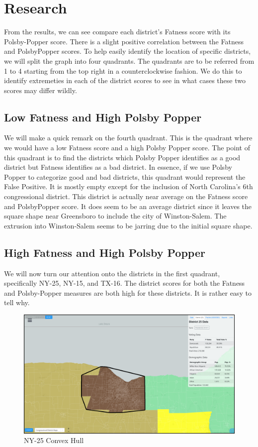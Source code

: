 \documentclass[letterpaper]{article}
\begin{document}
\section{Research}
From the results, we can see compare each district's Fatness score with its Polsby-Popper score. There is a slight positive correlation between the Fatness and PolsbyPopper scores.
To help easily identify the location of specific districts, we will split the graph into four quadrants. The quadrants are to be referred from 1 to 4 starting from the top right in a counterclockwise fashion. We do this to identify extremeties in each of the district scores to see in what cases these two scores may differ wildly.

\subsection{Low Fatness and High Polsby Popper}
We will make a quick remark on the fourth quadrant. This is the quadrant where we would have a low Fatness score and a high Polsby Popper score. The point of this quadrant is to find the districts which Polsby Popper identifies as a good district but Fatness identifies as a bad district. In essence, if we use Polsby Popper to categorize good and bad districts, this quadrant would represent the False Positive. It is mostly empty except for the inclusion of North Carolina's 6th congressional district.
This district is actually near average on the Fatness score and PolsbyPopper score. It does seem to be an average district since it leaves the square shape near Greensboro to include the city of Winston-Salem. The extrusion into Winston-Salem seems to be jarring due to the initial square shape.

\subsection{High Fatness and High Polsby Popper}
We will now turn our attention onto the districts in the first quadrant, specifically NY-25, NY-15, and TX-16. The district scores for both the Fatness and Polsby-Popper measures are both high for these districts. It is rather easy to tell why.

\begin{figure}[H]
	\includegraphics[width=\linewidth]{./figures/NY-25-ConvexHull.png}
	\caption{NY-25 Convex Hull}
	\label{fig:ny25convexHull}
\end{figure}
\end{document}
